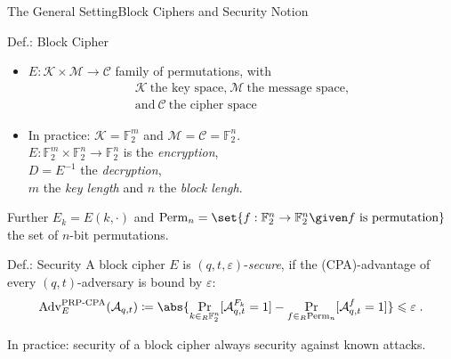 \documentclass[%
    10pt,
    professionalfont,
    aspectratio=169,
    handout,
]{beamer}
\DeclareMathOperator*{\Prob}{Pr}
\newcommand{\F}{\mathbb{F}}
\begin{document}
\begin{frame}{The General Setting}{Block Ciphers and Security Notion}
    \centering
    \begin{block}{Def.: Block Cipher}
    \begin{minipage}{0.50\textwidth}
        \begin{itemize}
            \item $E : \mathcal{K} \times \mathcal{M} \to \mathcal{C}$ family of permutations, with
                \vspace{-5pt}
                \begin{gather*}
                    \mathcal{K}\ \text{the key space,}\ \mathcal{M}\ \text{the message space,}\\
                    \text{and}\ \mathcal{C}\ \text{the cipher space}
                \end{gather*}
        \end{itemize}
    \end{minipage}%
    \hspace{5pt}%
    \begin{minipage}{0.45\textwidth}
        \begin{itemize}
            \item In practice: $\mathcal{K} = \F_2^m$ and $\mathcal{M} = \mathcal{C} = \F_2^n$.\\
                  $E : \F_2^m \times \F_2^n \to \F_2^n$ is the \emph{encryption},\\
                  $D = E^{-1}$ the \emph{decryption},\\
                  $m$ the \emph{key length} and $n$ the \emph{block lengh}.
        \end{itemize}
    \end{minipage}
    \end{block}

    \pause
    Further $E_k = E(k, \cdot)$ and $\mathrm{Perm}_n = \set{f : \F_2^n \to \F_2^n \given f\ \text{is permutation}}$ the set of $n$-bit permutations.

    \begin{block}{Def.: Security}
        A block cipher $E$ is $(q,t,\varepsilon)$-\emph{secure}, if the (CPA)-advantage of every $(q,t)$-adversary is bound by $\varepsilon$:
        \begin{equation*}
            \mathrm{Adv}^{\text{PRP-CPA}}_{E}(\mathcal{A}_{q,t}) \coloneqq \abs{\Prob_{k \in_R \F_2^n}[\mathcal{A}^{F_k}_{q,t} = 1] - \Prob_{f \in_R \mathrm{Perm}_n}[\mathcal{A}^{f}_{q,t} = 1]} \leqslant \varepsilon\;.
        \end{equation*}
    \end{block}
    \pause

    \vfill
    In practice: security of a block cipher always security against known attacks.
\end{frame}
\end{document}
